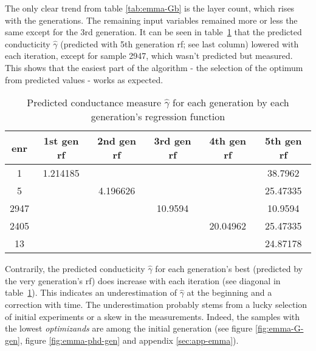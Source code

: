 The only clear trend from table \ref{tab:emma-Gb} is the layer count, which rises with the generations. 
The remaining input variables remained more or less the same except for the 3rd generation. 
%
It can be seen in table~\ref{tab:emma-pred-G} 
that the predicted conducticity $\hat{\gamma}$ 
(predicted with 5th generation \gls{rf}; see last column) lowered with each iteration, 
except for sample 2947, which wasn't predicted but measured. 
This shows that the easiest part of the algorithm - the selection of the optimum 
from predicted values - works as expected. 
\begin{table}
	\centering
    \caption{Predicted conductance measure $\hat{\gamma}$ for each generation by each generation's regression function}  
    \label{tab:emma-pred-G}
    \begin{tabular}{cccccc}
        \hline\hline
    enr &1st gen \gls{rf}   &2nd gen \gls{rf} &3rd gen \gls{rf}    &4th gen \gls{rf}   &5th gen \gls{rf}\\
        \hline
    1       &1.214185    &       &       &       &38.7962       \\
    5       &       &4.196626       &       &       &25.47335       \\
    2947    &       &       &10.9594    &       &10.9594       \\
    2405    &       &       &       &20.04962   &25.47335       \\
    13      &       &       &       &       &24.87178   \\
        \hline\hline
    \end{tabular}
\end{table}
%
Contrarily, the predicted conducticity $\hat{\gamma}$ for each generation's best 
(predicted by the very generation's \gls{rf}) does increase with each iteration 
(see diagonal in table~\ref{tab:emma-pred-G}). 
This indicates an underestimation of $\hat\gamma$ at the beginning and a correction with time. 
The underestimation probably stems from a lucky selection of initial experiments or a skew in the measurements. 
\linebreak[4]
Indeed, the samples with the lowest \textit{optimizands} are among the initial generation (see figure \ref{fig:emma-G-gen}, figure \ref{fig:emma-phd-gen} and appendix \ref{sec:app-emma}).

